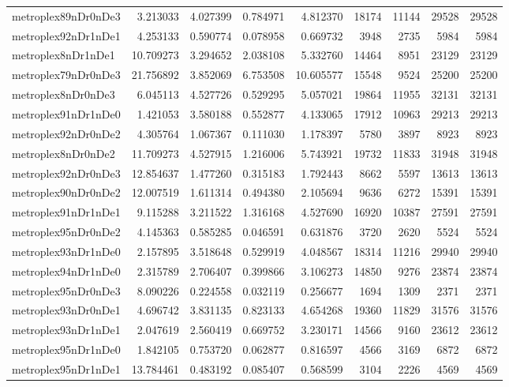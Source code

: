 \begin{longtable}{|l|r|r|r|r|r|r|r|r|}
metroplex89nDr0nDe3 & 3.213033 & 4.027399 & 0.784971 & 4.812370 & 18174 & 11144 & 29528 & 29528 \\
metroplex92nDr1nDe1 & 4.253133 & 0.590774 & 0.078958 & 0.669732 & 3948 & 2735 & 5984 & 5984 \\
metroplex8nDr1nDe1 & 10.709273 & 3.294652 & 2.038108 & 5.332760 & 14464 & 8951 & 23129 & 23129 \\
metroplex79nDr0nDe3 & 21.756892 & 3.852069 & 6.753508 & 10.605577 & 15548 & 9524 & 25200 & 25200 \\
metroplex8nDr0nDe3 & 6.045113 & 4.527726 & 0.529295 & 5.057021 & 19864 & 11955 & 32131 & 32131 \\
metroplex91nDr1nDe0 & 1.421053 & 3.580188 & 0.552877 & 4.133065 & 17912 & 10963 & 29213 & 29213 \\
metroplex92nDr0nDe2 & 4.305764 & 1.067367 & 0.111030 & 1.178397 & 5780 & 3897 & 8923 & 8923 \\
metroplex8nDr0nDe2 & 11.709273 & 4.527915 & 1.216006 & 5.743921 & 19732 & 11833 & 31948 & 31948 \\
metroplex92nDr0nDe3 & 12.854637 & 1.477260 & 0.315183 & 1.792443 & 8662 & 5597 & 13613 & 13613 \\
metroplex90nDr0nDe2 & 12.007519 & 1.611314 & 0.494380 & 2.105694 & 9636 & 6272 & 15391 & 15391 \\
metroplex91nDr1nDe1 & 9.115288 & 3.211522 & 1.316168 & 4.527690 & 16920 & 10387 & 27591 & 27591 \\
metroplex95nDr0nDe2 & 4.145363 & 0.585285 & 0.046591 & 0.631876 & 3720 & 2620 & 5524 & 5524 \\
metroplex93nDr1nDe0 & 2.157895 & 3.518648 & 0.529919 & 4.048567 & 18314 & 11216 & 29940 & 29940 \\
metroplex94nDr1nDe0 & 2.315789 & 2.706407 & 0.399866 & 3.106273 & 14850 & 9276 & 23874 & 23874 \\
metroplex95nDr0nDe3 & 8.090226 & 0.224558 & 0.032119 & 0.256677 & 1694 & 1309 & 2371 & 2371 \\
metroplex93nDr0nDe1 & 4.696742 & 3.831135 & 0.823133 & 4.654268 & 19360 & 11829 & 31576 & 31576 \\
metroplex93nDr1nDe1 & 2.047619 & 2.560419 & 0.669752 & 3.230171 & 14566 & 9160 & 23612 & 23612 \\
metroplex95nDr1nDe0 & 1.842105 & 0.753720 & 0.062877 & 0.816597 & 4566 & 3169 & 6872 & 6872 \\
metroplex95nDr1nDe1 & 13.784461 & 0.483192 & 0.085407 & 0.568599 & 3104 & 2226 & 4569 & 4569 \\

\end{longtable}
